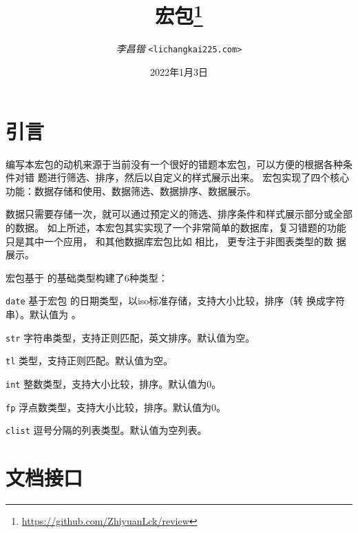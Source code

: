 \documentclass[full]{l3doc}
\begin{document}
\title{宏包\protect\footnote{\url{https://github.com/ZhiyuanLck/review}}}
\author{\textit{李昌锴} \texttt{<lichangkai225\@qq.com>}}
\date{2022年1月3日}
\maketitle
\tableofcontents
\newpage

\begin{documentation}

\section{引言}
编写本宏包的动机来源于当前没有一个很好的错题本宏包，可以方便的根据各种条件对错
题进行筛选、排序，然后以自定义的样式展示出来。 宏包实现了四个核心
功能：数据存储和使用、数据筛选、数据排序、数据展示。

数据只需要存储一次，就可以通过预定义的筛选、排序条件和样式展示部分或全部的数据。
如上所述，本宏包其实实现了一个非常简单的数据库，复习错题的功能只是其中一个应用，
和其他数据库宏包比如  相比， 更专注于非图表类型的数
据展示。

宏包基于  的基础类型构建了6种类型：
\begin{Description}
  \item[\texttt{date}]
    基于宏包  的日期类型，以iso标准存储，支持大小比较，排序（转
    换成字符串）。默认值为 。
  \item[\texttt{str}]
    字符串类型，支持正则匹配，英文排序。默认值为空。
  \item[\texttt{tl}]
    类型，支持正则匹配。默认值为空。
  \item[\texttt{int}]
    整数类型，支持大小比较，排序。默认值为0。
  \item[\texttt{fp}]
    浮点数类型，支持大小比较，排序。默认值为0。
  \item[\texttt{clist}]
    逗号分隔的列表类型。默认值为空列表。
\end{Description}

\section{文档接口}

\end{documentation}
\end{document}
